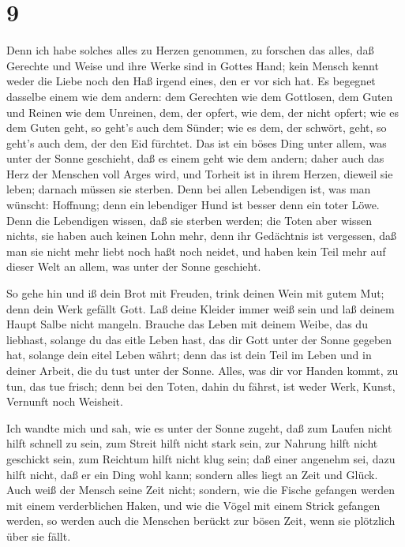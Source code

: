 \hypertarget{section-8}{%
\section{9}\label{section-8}}

 Denn ich habe solches alles zu Herzen genommen, zu forschen
das alles, daß Gerechte und Weise und ihre Werke sind in Gottes Hand;
kein Mensch kennt weder die Liebe noch den Haß irgend eines, den er vor
sich hat.  Es begegnet dasselbe einem wie dem andern: dem
Gerechten wie dem Gottlosen, dem Guten und Reinen wie dem Unreinen, dem,
der opfert, wie dem, der nicht opfert; wie es dem Guten geht, so geht's
auch dem Sünder; wie es dem, der schwört, geht, so geht's auch dem, der
den Eid fürchtet.  Das ist ein böses Ding unter allem, was
unter der Sonne geschieht, daß es einem geht wie dem andern; daher auch
das Herz der Menschen voll Arges wird, und Torheit ist in ihrem Herzen,
dieweil sie leben; darnach müssen sie sterben.  Denn bei
allen Lebendigen ist, was man wünscht: Hoffnung; denn ein lebendiger
Hund ist besser denn ein toter Löwe.  Denn die Lebendigen
wissen, daß sie sterben werden; die Toten aber wissen nichts, sie haben
auch keinen Lohn mehr, denn ihr Gedächtnis ist vergessen, 
daß man sie nicht mehr liebt noch haßt noch neidet, und haben kein Teil
mehr auf dieser Welt an allem, was unter der Sonne geschieht.

 So gehe hin und iß dein Brot mit Freuden, trink deinen Wein
mit gutem Mut; denn dein Werk gefällt Gott.  Laß deine
Kleider immer weiß sein und laß deinem Haupt Salbe nicht mangeln.
 Brauche das Leben mit deinem Weibe, das du liebhast,
solange du das eitle Leben hast, das dir Gott unter der Sonne gegeben
hat, solange dein eitel Leben währt; denn das ist dein Teil im Leben und
in deiner Arbeit, die du tust unter der Sonne.  Alles, was
dir vor Handen kommt, zu tun, das tue frisch; denn bei den Toten, dahin
du fährst, ist weder Werk, Kunst, Vernunft noch Weisheit.

 Ich wandte mich und sah, wie es unter der Sonne zugeht,
daß zum Laufen nicht hilft schnell zu sein, zum Streit hilft nicht stark
sein, zur Nahrung hilft nicht geschickt sein, zum Reichtum hilft nicht
klug sein; daß einer angenehm sei, dazu hilft nicht, daß er ein Ding
wohl kann; sondern alles liegt an Zeit und Glück.  Auch
weiß der Mensch seine Zeit nicht; sondern, wie die Fische gefangen
werden mit einem verderblichen Haken, und wie die Vögel mit einem Strick
gefangen werden, so werden auch die Menschen berückt zur bösen Zeit,
wenn sie plötzlich über sie fällt.

